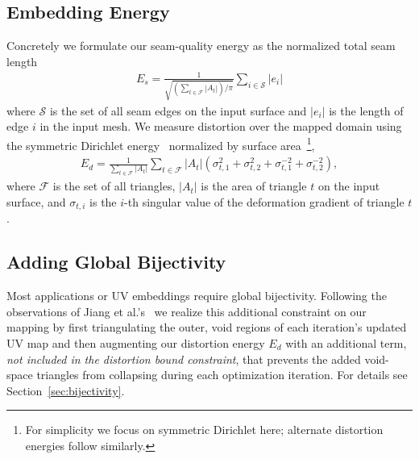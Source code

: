 \subsection{Embedding Energy}
Concretely we formulate our seam-quality energy as the normalized total seam length
\begin{align}
E_s 
= \frac{1}{\sqrt{(\sum_{t\in\mathcal{F}} |A_t|)/\pi}} \sum_{i \in \mathcal{S}} |e_i|
\end{align}
where $\mathcal{S}$ is the set of all seam edges on the input surface and $|e_i|$ is the length of edge $i$ in the input mesh.
We measure distortion over the mapped domain using the symmetric Dirichlet energy~\cite{Smith2015Bijective} normalized by surface area~\footnote{For simplicity we focus on symmetric Dirichlet here; alternate distortion energies follow similarly.}, 
\begin{align} 
E_d 
= \frac{1}{\sum_{t\in\mathcal{F}} |A_t|} \sum_{t\in\mathcal{F}} |A_t|(\sigma_{t,1}^2 + \sigma_{t,2}^2 + \sigma_{t,1}^{-2} + \sigma_{t,2}^{-2}),
\end{align}
where $\mathcal{F}$ is the set of all triangles, $|A_t|$ is the area of triangle $t$ on the input surface, and $\sigma_{t,i}$ is the $i$-th singular value of the deformation gradient of triangle $t$.
%


\subsection{Adding Global Bijectivity}
Most applications or UV embeddings  require global bijectivity. Following the observations of Jiang et al.'s\  we realize this additional constraint on our mapping by first triangulating the outer, void regions of each iteration's updated UV map and then augmenting our distortion energy $E_d$ with an additional term, \emph{not included in the distortion bound constraint}, that prevents the added void-space triangles from collapsing during each optimization iteration. For details see Section\ \ref{sec:bijectivity}. 


